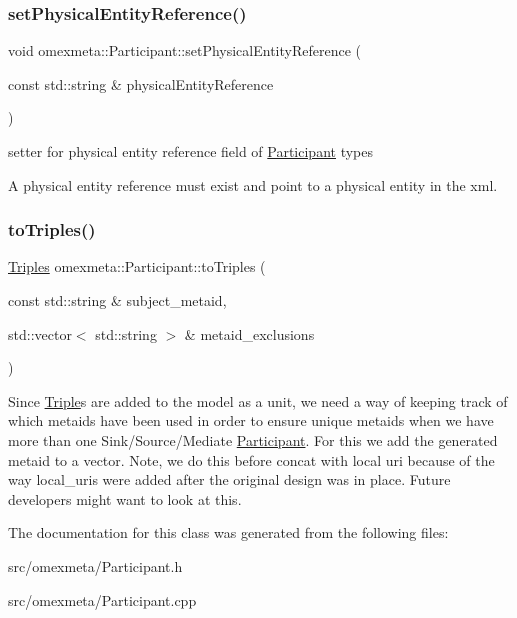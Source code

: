 \subsubsection{\texorpdfstring{set\+Physical\+Entity\+Reference()}{setPhysicalEntityReference()}}
{\footnotesize\ttfamily void omexmeta\+::\+Participant\+::set\+Physical\+Entity\+Reference (\begin{DoxyParamCaption}\item[{const std\+::string \&}]{physical\+Entity\+Reference }\end{DoxyParamCaption})}



setter for physical entity reference field of \hyperlink{classomexmeta_1_1Participant}{Participant} types 

A physical entity reference must exist and point to a physical entity in the xml. \mbox{\label{classomexmeta_1_1Participant_a6757eea8a56972eb369e0e102ae5bfc8}} 
\subsubsection{\texorpdfstring{to\+Triples()}{toTriples()}}
{\footnotesize\ttfamily \hyperlink{classomexmeta_1_1Triples}{Triples} omexmeta\+::\+Participant\+::to\+Triples (\begin{DoxyParamCaption}\item[{const std\+::string \&}]{subject\+\_\+metaid,  }\item[{std\+::vector$<$ std\+::string $>$ \&}]{metaid\+\_\+exclusions }\end{DoxyParamCaption})}

Since \hyperlink{classomexmeta_1_1Triple}{Triple}\textquotesingle{}s are added to the model as a unit, we need a way of keeping track of which metaids have been used in order to ensure unique metaid\textquotesingle{}s when we have more than one Sink/\+Source/\+Mediate \hyperlink{classomexmeta_1_1Participant}{Participant}. For this we add the generated metaid to a vector. Note, we do this before concat with local uri because of the way local\+\_\+uri\textquotesingle{}s were added after the original design was in place. Future developers might want to look at this.

The documentation for this class was generated from the following files\+:\begin{DoxyCompactItemize}
\item 
src/omexmeta/Participant.\+h\item 
src/omexmeta/Participant.\+cpp\end{DoxyCompactItemize}
